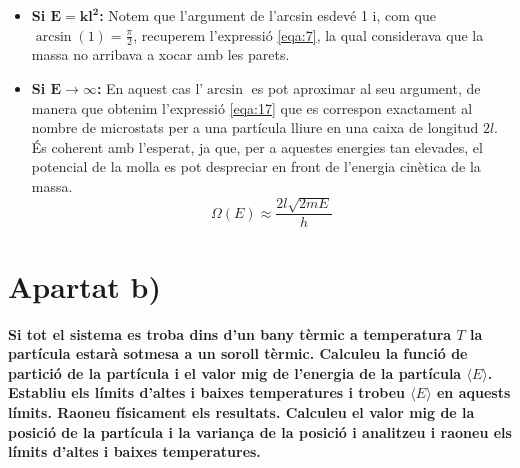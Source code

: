 \documentclass[a4paper, 10pt]{article}
\begin{document}
\begin{itemize}
	\item \textbf{Si $\boldsymbol{E=kl^2}$:} Notem que l'argument de l'arcsin esdevé 1 i, com que $\arcsin(1)=\frac{\pi}{2}$, recuperem l'expressió \eqref{eqa:7}, la qual considerava que la massa no arribava a xocar amb les parets.
	\item \textbf{Si $\boldsymbol{E\to \infty}$:} En aquest cas l'$\arcsin$ es pot aproximar al seu argument, de manera que obtenim l'expressió \eqref{eqa:17} que es correspon exactament al nombre de microstats per a una partícula lliure en una caixa de longitud $2l$. És coherent amb l'esperat, ja que, per a aquestes energies tan elevades, el potencial de la molla es pot despreciar en front de l'energia cinètica de la massa.
	\begin{equation}
		\Omega\left(E\right)\approx\frac{2l\sqrt{2mE}}{h}
	\label{eqa:17}
	\end{equation}
\end{itemize}

\section*{Apartat b)}
\textbf{Si tot el sistema es troba dins d'un bany tèrmic a temperatura $T$ la partícula estarà sotmesa a un soroll tèrmic. Calculeu la funció de partició de la partícula i el valor mig de l'energia de la partícula $\langle E \rangle$. Establiu els límits d'altes i baixes temperatures i trobeu $\langle E \rangle$ en aquests límits. Raoneu físicament els resultats. Calculeu el valor mig de la posició de la partícula i la variança de la posició i analitzeu i raoneu els límits d'altes i baixes temperatures.}
\end{document}
